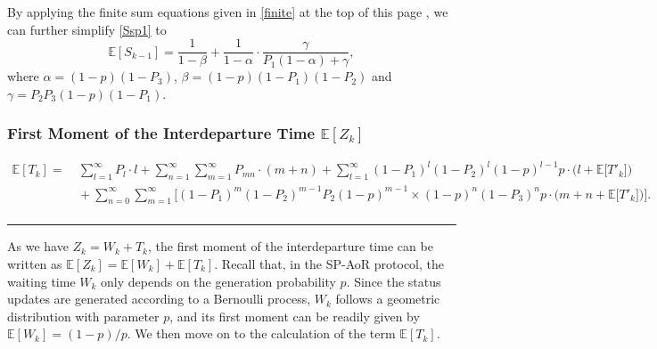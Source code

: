 \documentclass{IEEEtran}
\begin{document}
By applying the finite sum equations given in \eqref{finite} at the top of this page \cite[Eqs. (0.112) and (0.113)]{b7}, we can further simplify \eqref{Ssp1} to
\begin{equation}\label{Ssp2}
\mathbb{E}[S_{k-1}]=\frac{1}{1-\beta}+\frac{1}{1-\alpha}\cdot\frac{\gamma}{P_{1}(1-\alpha)+\gamma},
\end{equation}
where $\alpha=(1-p)(1-P_{3})$, $\beta=(1-p)(1-P_{1})(1-P_{2})$ and $\gamma=P_{2}P_{3}(1-p)(1-P_{1})$. 



\subsubsection{First Moment of the Interdeparture Time $\mathbb{E}[Z_{k}]$}

\begin{figure*}
	\begin{equation}\label{Tsp1}
	\begin{aligned}
	\mathbb{E}[T_{k}]=&\
	\sum_{l=1}^{\infty}P_{l}\cdot l + \sum_{n=1}^{\infty}\sum_{m=1}^{\infty}P_{mn}\cdot (m+n)
	+ \sum_{l=1}^{\infty}(1-P_{1})^{l}(1-P_{2})^{l}(1-p)^{l-1}p\cdot \big(l+\mathbb{E}\big[T'_{k}\big]\big)\\ &\,+\sum_{n=0}^{\infty}\sum_{m=1}^{\infty}\Big[(1-P_{1})^{m}(1-P_{2})^{m-1}P_{2}(1-p)^{m-1}
	\times(1-p)^{n}(1-P_{3})^{n}p\cdot \big(m+n+\mathbb{E}\big[T'_{k}\big]\big)\!\Big].\\
	\end{aligned}
	\end{equation}
	\vspace{-0.5cm}
	\noindent\rule[0.05\baselineskip]{\textwidth}{0.5pt}
\end{figure*}

As we have $Z_{k}=W_{k}+T_{k}$, the first moment of the interdeparture time can be written as $\mathbb{E}[Z_{k}]=\mathbb{E}[W_{k}]+\mathbb{E}[T_{k}]$. Recall that, in the SP-AoR protocol, the waiting time $W_{k}$ only depends on the generation probability $p$. Since the status updates are generated according to a Bernoulli process, $W_{k}$ follows a geometric distribution with parameter $p$, and its first moment can be readily given by $\mathbb{E}[W_{k}]=(1-p)/p$. We then move on to the calculation of the term $\mathbb{E}[T_{k}]$.
\end{document}
